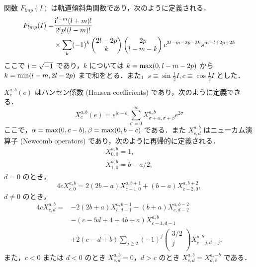 \documentclass[11pt,a4paper,oneside,onecolumn]{jarticle}
\begin{document}
関数 $F_{lmp} (I)$ は軌道傾斜角関数であり，次のように定義される．
\begin{equation}
\begin{split}
F_{lmp} (I) = & \frac{{\rm i}^{l - m} (l + m) !}{2^l p ! (l - m) !} \\
& \times \sum_k (-1)^k 
\begin{pmatrix}
2l - 2p \\
k \\
\end{pmatrix}
\begin{pmatrix}
2p \\
l - m - k \\
\end{pmatrix}
c^{3l - m - 2p - 2k} s^{m - l + 2p + 2k}
\end{split} \label{eq:F_lmp}
\end{equation}
ここで ${\rm i} = \sqrt{-1}$ であり，$k$ については $k = {\rm max} (0, l - m - 2p)$ から $k = {\rm min} (l - m, 2l - 2p)$ まで和をとる．また，$s \equiv \sin \frac{1}{2} I, c \equiv \cos \frac{1}{2} I$ とした．

$X_c^{a, b} (e)$ はハンセン係数 (Hansen coefficients) であり，次のように定義できる．
\begin{equation}
X_c^{a, b} (e) = e^{|c - b|} \sum_{\sigma = 0}^{\infty} X_{\sigma + \alpha, \sigma + \beta}^{a, b} e^{2 \sigma}
\end{equation}
ここで，$\alpha = {\rm max} (0, c - b), \beta = {\rm max} (0, b - c)$ である．また $X_{c, d}^{a, b}$ はニューカム演算子 (Newcomb operators) であり，次のように再帰的に定義される．
\begin{eqnarray}
X_{0, 0}^{a, b} = 1,\\
X_{1, 0}^{a, b} = b - a / 2,
\end{eqnarray}
$d = 0$ のとき，
\begin{equation}
4 c X_{c, 0}^{a, b} = 2 (2b - a) X_{c - 1, 0}^{a, b + 1} + (b - a) X_{c - 2, 0}^{a, b + 2},
\end{equation}
$d \not = 0$ のとき，
\begin{equation}
\begin{split}
4 c X_{c, d}^{a, b} = & -2 (2b + a) X_{c, d - 1}^{a, b - 1} - (b + a) X_{c, d - 2}^{a, b - 2} \\
& - (c - 5d + 4 + 4b +a) X_{c - 1, d - 1}^{a, b} \\
& + 2 (c - d + b) \sum_{j \geqq 2} (-1)^j
\begin{pmatrix}
3/2 \\
j \\
\end{pmatrix}
X_{c - j, d - j}^{a, b}.
\end{split} \label{eq:4dX}
\end{equation}
また，$c < 0$ または $d < 0$ のとき $X_{c, d}^{a, b} = 0$，$d > c$ のとき $X_{c, d}^{a, b} = X_{d, c}^{a, -b}$ である．
\end{document}
